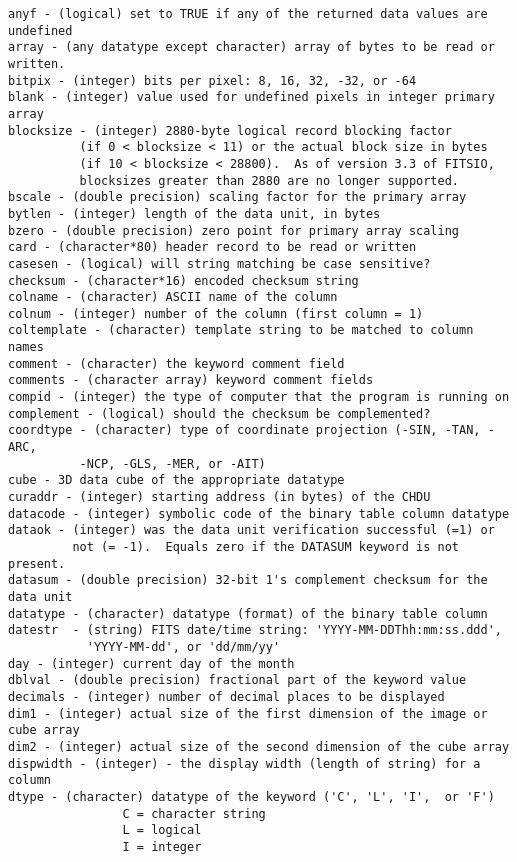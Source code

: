 \documentclass[11pt]{book}
\begin{document}
\begin{verbatim}
anyf - (logical) set to TRUE if any of the returned data values are undefined
array - (any datatype except character) array of bytes to be read or written.
bitpix - (integer) bits per pixel: 8, 16, 32, -32, or -64
blank - (integer) value used for undefined pixels in integer primary array
blocksize - (integer) 2880-byte logical record blocking factor
          (if 0 < blocksize < 11) or the actual block size in bytes
          (if 10 < blocksize < 28800).  As of version 3.3 of FITSIO,
          blocksizes greater than 2880 are no longer supported.
bscale - (double precision) scaling factor for the primary array
bytlen - (integer) length of the data unit, in bytes
bzero - (double precision) zero point for primary array scaling
card - (character*80) header record to be read or written
casesen - (logical) will string matching be case sensitive?
checksum - (character*16) encoded checksum string
colname - (character) ASCII name of the column
colnum - (integer) number of the column (first column = 1)
coltemplate - (character) template string to be matched to column names
comment - (character) the keyword comment field
comments - (character array) keyword comment fields
compid - (integer) the type of computer that the program is running on
complement - (logical) should the checksum be complemented?
coordtype - (character) type of coordinate projection (-SIN, -TAN, -ARC,
          -NCP, -GLS, -MER, or -AIT)
cube - 3D data cube of the appropriate datatype
curaddr - (integer) starting address (in bytes) of the CHDU
datacode - (integer) symbolic code of the binary table column datatype
dataok - (integer) was the data unit verification successful (=1) or
         not (= -1).  Equals zero if the DATASUM keyword is not present.
datasum - (double precision) 32-bit 1's complement checksum for the data unit
datatype - (character) datatype (format) of the binary table column
datestr  - (string) FITS date/time string: 'YYYY-MM-DDThh:mm:ss.ddd',
           'YYYY-MM-dd', or 'dd/mm/yy'
day - (integer) current day of the month
dblval - (double precision) fractional part of the keyword value
decimals - (integer) number of decimal places to be displayed
dim1 - (integer) actual size of the first dimension of the image or cube array
dim2 - (integer) actual size of the second dimension of the cube array
dispwidth - (integer) - the display width (length of string) for a column
dtype - (character) datatype of the keyword ('C', 'L', 'I',  or 'F')
                C = character string
                L = logical
                I = integer

\end{verbatim}
\end{document}
